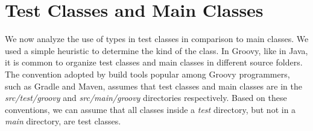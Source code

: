 \documentclass[msc]{ppgccufmg}
\begin{document}
% 
% 
% 





\section{Test Classes and Main Classes\label{sec:results-tests}}
We now analyze the use of types in test classes in comparison to main classes.
We used a simple heuristic to determine the kind of the class.
In Groovy, like in Java, it is common to organize test classes and main classes in different source folders.
The convention adopted by build tools popular among Groovy programmers, such as Gradle and Maven, assumes that test classes and main classes are in the \emph{src/test/groovy} and \emph{src/main/groovy} directories respectively.
Based on these conventions, we can assume that all classes inside a \emph{test} directory, but not in a \emph{main} directory, are test classes.
\end{document}
